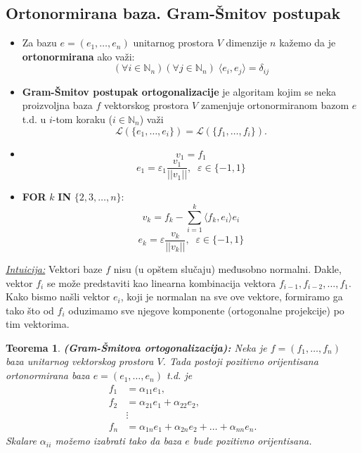 \documentclass[a4paper,12pt,twoside]{report}
\newtheorem{theorem}{Teorema}[section]
\numberwithin{algorithm}{section}
\begin{document}
\newpage
\subsection{Ortonormirana baza. Gram-Šmitov postupak}
\label{gramSmitAlgo}

\begin{itemize}
    \item Za bazu $e = (e_1, \dots, e_n)$ unitarnog prostora $V$ dimenzije $n$ kažemo da je \textbf{ortonormirana} ako važi:
    \[ (\forall i \in \mathbb{N}_n)(\forall j \in \mathbb{N}_n) \; \langle e_i, e_j \rangle = \delta_{ij} \]
    \item \textbf{Gram-Šmitov postupak ortogonalizacije} je algoritam kojim se neka proizvoljna baza $f$ vektorskog prostora $V$
    zamenjuje ortonormiranom bazom $e$ t.d. u $i$-tom koraku ($i \in \mathbb{N}_n$) važi
    \[ \mathcal{L}(\{ e_1, \dots, e_i \}) = \mathcal{L}(\{ f_1, \dots, f_i \}).\]
\end{itemize}

\begin{algorithm}[!h]
    \caption{Gram-Šmitov postupak ortogonalizacije}
    \begin{itemize}
        \item \[ v_1 = f_1\]
        \[ e_1 = \varepsilon_1 \frac{v_1}{||v_1||}, \;\; \varepsilon \in \{-1, 1\}\]
        \item \textbf{FOR} $k$ \textbf{IN} $\{ 2, 3, \dots, n \}$:
        \[ v_k = f_k - \sum_{i=1}^{k} \langle f_k, e_i \rangle e_i \]
        \[ e_k = \varepsilon \frac{v_k}{||v_k ||}, \;\; \varepsilon \in \{-1, 1\} \]
    \end{itemize}
\end{algorithm}
\noindent\underline{\textit{Intuicija:}} Vektori baze $f$ nisu (u opštem slučaju) međusobno normalni. Dakle, vektor $f_i$ 
se može predstaviti kao linearna kombinacija vektora $f_{i-1}, f_{i-2}, \dots, f_1$. Kako bismo našli vektor $e_i$, koji je 
normalan na sve ove vektore, formiramo ga tako što od $f_i$ oduzimamo sve njegove komponente (ortogonalne projekcije)
 po tim vektorima.

\begin{theorem}
    \textbf{(Gram-Šmitova ortogonalizacija):} Neka je $f = (f_1, \dots, f_n)$ baza unitarnog vektorskog prostora $V$. Tada 
    postoji pozitivno orijentisana ortonormirana baza $e = (e_1, \dots, e_n)$ t.d. je
    \[
        \begin{aligned}
            f_1 &= \alpha_{11}e_1, \\
            f_2 &= \alpha_{21}e_1 + \alpha_{22}e_2, \\
            &\vdots \\
            f_n &= \alpha_{1n}e_1 + \alpha_{2n}e_2 + \dots + \alpha_{nn}e_n.
        \end{aligned}
    \]
        Skalare $\alpha_{ii}$ možemo izabrati tako da baza $e$ bude pozitivno orijentisana.
\end{theorem}
\newpage
\end{document}
